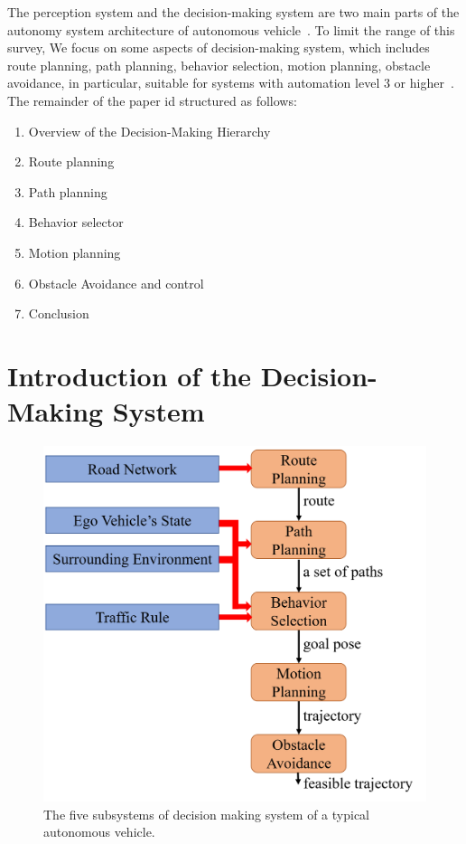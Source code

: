 \documentclass[conference]{IEEEtran}
\begin{document}
The perception system and the decision-making system are two main parts of the autonomy system architecture of autonomous vehicle~\cite{Brian2016}. To limit the range of this survey, We focus on some aspects of decision-making system, which includes route planning, path planning, behavior selection, motion planning, obstacle avoidance, in particular, suitable for systems with automation level 3 or higher~\cite{self_driving}.
The remainder of the paper id structured as follows:
\begin{enumerate}
	\item Overview of the Decision-Making Hierarchy
	\item Route planning
	\item Path planning
	\item Behavior selector
	\item Motion planning
	\item Obstacle Avoidance and control
	\item Conclusion
\end{enumerate}


\section{Introduction of the Decision-Making System}

\begin{figure}[htbp]
	\centering
	\includegraphics[width=1\columnwidth]{./picture/architecture.png}
	\caption{\label{architecture}
		The five subsystems of decision making system of a typical autonomous vehicle.}
\end{figure}
\end{document}
